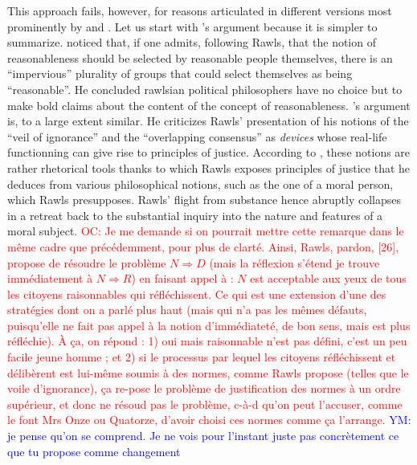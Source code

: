 \documentclass[preprint, french, english, 11pt]{elsarticle}%
\newcommand{\commentYM}[1]{\textcolor{blue}{YM: #1}}
\newcommand{\commentOC}[1]{\textcolor{red}{OC: #1}}
\begin{document}
This approach fails, however, for reasons articulated in different versions most prominently by \cite{habermas_reconciliation_1995} and \cite{estlund_democratic_2009}. Let us start with \cite{estlund_democratic_2009}'s argument because it is simpler to summarize. \cite{estlund_democratic_2009} noticed that, if one admits, following Rawls, that the notion of reasonableness should be selected by reasonable people themselves, there is an ``impervious'' plurality of groups that could select themselves as being ``reasonable''. He concluded rawlsian political philosophers have no choice but to make bold claims about the content of the concept of reasonableness. \cite{habermas_reconciliation_1995}'s argument is, to a large extent similar. He criticizes Rawls' presentation of his notions of the ``veil of ignorance'' and the ``overlapping consensus'' as \emph{devices} whose real-life functionning can give rise to principles of justice. According to \cite{habermas_reconciliation_1995}, these notions are rather rhetorical tools thanks to which Rawls exposes principles of justice that he deduces from various philosophical notions, such as the one of a moral person, which Rawls presupposes. Rawls' flight from substance hence abruptly collapses in a retreat back to the substantial inquiry into the nature and features of a moral subject.
\commentOC{Je me demande si on pourrait mettre cette remarque dans le même cadre que précédemment, pour plus de clarté. Ainsi, Rawls, pardon, [26], propose de résoudre le problème $N ⇒ D$ (mais la réflexion s’étend je trouve immédiatement à $N ⇒ R$) en faisant appel à : $N$ est acceptable aux yeux de tous les citoyens raisonnables qui réfléchissent. Ce qui est une extension d’une des stratégies dont on a parlé plus haut (mais qui n’a pas les mêmes défauts, puisqu’elle ne fait pas appel à la notion d’immédiateté, de bon sens, mais est plus réfléchie). À ça, on répond : 1) oui mais raisonnable n’est pas défini, c’est un peu facile jeune homme ; et 2) si le processus par lequel les citoyens réfléchissent et délibèrent est lui-même soumis à des normes, comme Rawls propose (telles que le voile d’ignorance), ça re-pose le problème de justification des normes à un ordre supérieur, et donc ne résoud pas le problème, c-à-d qu’on peut l’accuser, comme le font Mrs Onze ou Quatorze, d’avoir choisi ces normes comme ça l’arrange.}
\commentYM{je pense qu'on se comprend. Je ne vois pour l'instant juste pas concrètement ce que tu propose comme changement}
\end{document}
